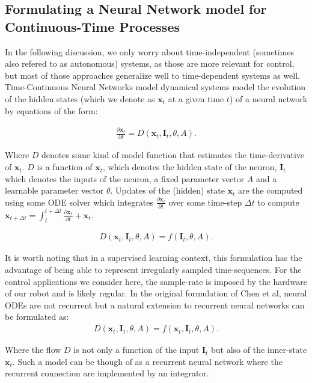 \subsection{Formulating a Neural Network model for Continuous-Time Processes}

In the following discussion, we only worry about time-independent (sometimes also refered to as autonomous) systems, as those are more relevant for control, but most of those approaches generalize well to time-dependent systems as well. Time-Continuous Neural Networks model dynamical systems model the evolution of the hidden states (which we denote as $\bm{x}_t$ at a given time $t$) of a neural network by equations of the form: 

\begin{align}
    \frac{\partial \bm{x}_t}{\partial t} = D(\bm{x}_t, \bm{I}_t, \theta, A).
\end{align}
 
 Where $D$ denotes some kind of model function that estimates the time-derivative of $\bm{x}_t$. $D$ is a function of $\bm{x}_t$, which denotes the hidden state of the neuron, $\bm{I}_t$ which denotes the inputs of the neuron, a fixed parameter vector $A$ and a learnable parameter vector $\theta$. Updates of the (hidden) state $\bm{x}_t$ are the computed using some ODE solver which integrates $\frac{\partial \bm{x}_t}{\partial t}$ over some time-step $\Delta t$ to compute $\bm{x}_{t+\Delta t} = \int_t^{t+\Delta t} \frac{\partial \bm{x}_t}{\partial t} + \bm{x}_t$.
 
 
 \begin{align}
    D(\bm{x}_t, \bm{I}_t, \theta, A) =  f(\bm{I}_t, \theta, A).
\end{align}
 
 It is worth noting that in a supervised learning context, this formulation has the advantage of being able to represent irregularly sampled time-sequences. For the control applications we consider here, the sample-rate is imposed by the hardware of our robot and is likely regular. In the original formulation of Chen et al, neural ODEs are not recurrent but a natural extension to recurrent neural networks can be formulated as: \\

 \begin{align}
    D(\bm{x}_t, \bm{I}_t, \theta, A) =  f(\bm{x}_t, \bm{I}_t, \theta, A).
\end{align}
 
Where the flow $D$ is not only a function of the input $\bm{I}_t$ but also of the inner-state $\bm{x}_t$. Such a model can be though of as a recurrent neural network where the recurrent connection are implemented by an integrator.

